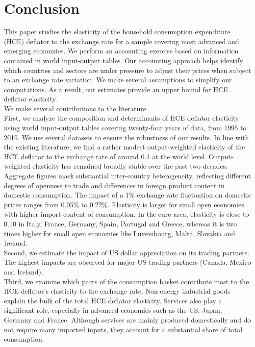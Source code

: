 \documentclass[11pt,a4paper]{paper} %
\begin{document}
\section{Conclusion}
\label{sec:ccl}
This paper studies the elasticity of the household consumption expenditure (HCE) deflator to the exchange rate for a sample covering most advanced and emerging economies.
We perform an accounting exercise based on information contained in world input-output tables.
Our accounting approach helps identify which countries and sectors are under pressure to adjust their prices when subject to an exchange rate variation.
We make several assumptions to simplify our computations.
As a result, our estimates provide an upper bound for HCE deflator elasticity. \\
We make several contributions to the literature. \\
First, we analyze the composition and determinants of HCE deflator elasticity using world input-output tables covering twenty-four years of data, from 1995 to 2019. 
We use several datasets to ensure the robustness of our results.
In line with the existing literature, we find a rather modest output-weighted elasticity of the HCE deflator to the exchange rate of around 0.1 at the world level.
Output-weighted elasticity has remained broadly stable over the past two decades.
Aggregate figures mask substantial inter-country heterogeneity, reflecting different degrees of openness to trade and differences in foreign product content in domestic consumption. 
The impact of a 1\% exchange rate fluctuation on domestic prices ranges from 0.05\% to 0.22\%.
Elasticity is larger for small open economies with higher import content of consumption. 
In the euro area, elasticity is close to 0.10 in Italy, France, Germany, Spain, Portugal and Greece, whereas it is two times higher for small open economies like Luxembourg, Malta, Slovakia and Ireland.\\
Second, we estimate the impact of US dollar appreciation on its trading partners. 
The highest impacts are observed for major US trading partners (Canada, Mexico and Ireland).\\
Third, we examine which parts of the consumption basket contribute most to the HCE deflator's elasticity to the exchange rate. 
Non-energy industrial goods explain the bulk of the total HCE deflator elasticity. 
Services also play a significant role, especially in advanced economies such as the US, Japan, Germany and France.
Although services are mainly produced domestically and do not require many imported inputs, they account for a substantial share of total consumption.
\end{document}

